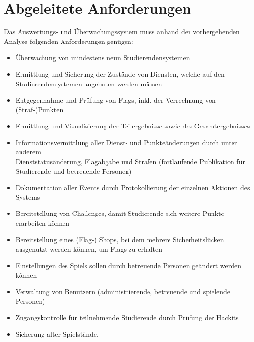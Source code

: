 \section{Abgeleitete Anforderungen}
\label{sec:Abgeleitete_Anforderungen}

Das Auswertungs- und Überwachungssystem muss anhand der vorhergehenden Analyse folgenden Anforderungen genügen:
\begin{itemize}
	\item Überwachung von mindestens neun Studierendensystemen
	\item Ermittlung und Sicherung der Zustände von Diensten, welche auf den Studierendensystemen angeboten werden müssen
	\item Entgegennahme und Prüfung von Flags, inkl. der Verrechnung von (Straf-)Punkten
	\item Ermittlung und Visualisierung der Teilergebnisse sowie des Gesamtergebnisses
	\item Informationsvermittlung aller Dienst- und Punkteänderungen durch unter anderem \\ Dienststatusänderung, Flagabgabe und Strafen (fortlaufende Publikation für Studierende und betreuende Personen)
	\item Dokumentation aller Events durch Protokollierung der einzelnen Aktionen des Systems
	\item Bereitstellung von Challenges, damit Studierende sich weitere Punkte erarbeiten können
	\item Bereitstellung eines (Flag-) Shops, bei dem mehrere Sicherheitslücken ausgenutzt werden können, um Flags zu erhalten
	\item Einstellungen des Spiels sollen durch betreuende Personen geändert werden können
	\item Verwaltung von Benutzern (administrierende, betreuende und spielende Personen)
	\item Zugangskontrolle für teilnehmende Studierende durch Prüfung der Hackits
	\item Sicherung alter Spielstände.
\end{itemize}